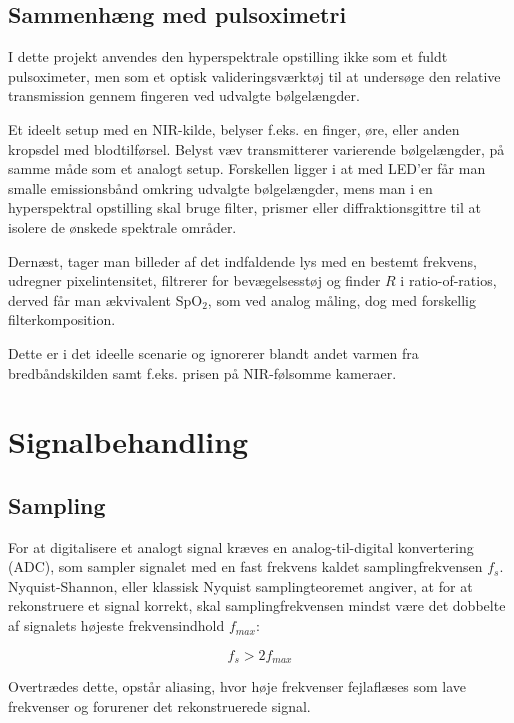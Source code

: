    \subsection{Sammenhæng med pulsoximetri}
    I dette projekt anvendes den hyperspektrale opstilling ikke som et fuldt pulsoximeter, men som et optisk valideringsværktøj til at undersøge den relative transmission gennem fingeren ved udvalgte bølgelængder.

    Et ideelt setup med en NIR-kilde, belyser f.eks. en finger, øre, eller anden kropsdel med blodtilførsel. Belyst væv transmitterer varierende bølgelængder, på samme måde som et analogt setup. Forskellen ligger i at med LED'er får man smalle emissionsbånd omkring udvalgte bølgelængder, mens man i en hyperspektral opstilling skal bruge filter, prismer eller diffraktionsgittre til at isolere de ønskede spektrale områder.

    Dernæst, tager man billeder af det indfaldende lys med en bestemt frekvens, udregner pixelintensitet, filtrerer for bevægelsesstøj og finder $R$ i ratio-of-ratios, derved får man ækvivalent SpO$_2$, som ved analog måling, dog med forskellig filterkomposition.

    Dette er i det ideelle scenarie og ignorerer blandt andet varmen fra bredbåndskilden samt f.eks. prisen på NIR-følsomme kameraer.


\section{Signalbehandling}
\label{sec:signalbehandling}

\subsection{Sampling}
\label{sec:sampling}

For at digitalisere et analogt signal kræves en analog-til-digital konvertering (ADC), som sampler signalet med en fast frekvens kaldet samplingfrekvensen $f_s$. Nyquist-Shannon, eller klassisk Nyquist samplingteoremet angiver, at for at rekonstruere et signal korrekt, skal samplingfrekvensen mindst være det dobbelte af signalets højeste frekvensindhold $f_{max}$:

\begin{equation}
    f_s > 2 f_{max}
    \label{eq:nyquist}
\end{equation}

Overtrædes dette, opstår aliasing, hvor høje frekvenser fejlaflæses som lave frekvenser og forurener det rekonstruerede signal.

